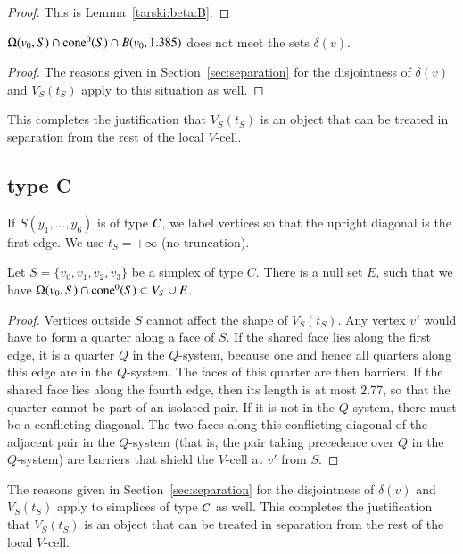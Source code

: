 \begin{proof} This is Lemma~\ref{tarski:beta:B}.
\end{proof}

\begin{lemma} $\Omega(v_0,S) \cap {\operatorname{cone}}^0(S) \cap B(v_0,1.385)$
does not meet the sets $\delta(v)$.
\end{lemma}

\begin{proof}
The reasons given in Section~\ref{sec:separation} for the
disjointness of $\delta(v)$ and $V_S(t_S)$ apply to this
situation as well.
\end{proof}


This completes the justification that
$V_S(t_S)$ is an object that can be treated in separation from the
rest of the local $V$-cell.

\subsection{type C}%

If $S(y_1,\ldots,y_6)$ is of type $C$, we label vertices so that
the upright diagonal is the first edge.  We use $t_S =+\infty$ (no
truncation).   

\begin{lemma} Let $S=\{v_0,v_1,v_2,v_3\}$ be a simplex of type $C$.
There is a null set $E$, such that
we have  $ \Omega(v_0,S) \cap {\operatorname{cone}}^0(S) \subset V_S \cup E$.
\end{lemma}

\begin{proof}  %
Vertices outside $S$ cannot affect the shape of $V_S(t_S)$.  Any
vertex $v'$ would have to form a quarter along a face of $S$.  If
the shared face lies along the first edge, it is a quarter $Q$ in
the $Q$-system, because one and hence all quarters along this edge
are in the $Q$-system.  The faces of this quarter are then
barriers. If the shared face lies along the fourth edge, then its
length is at most $2.77$, so that the quarter cannot be part of an
isolated pair. If it is not in the $Q$-system, there must be a
conflicting diagonal. The two faces along this conflicting
diagonal of the adjacent pair in the $Q$-system (that is, the pair
taking precedence over $Q$ in the $Q$-system) are barriers that
shield the $V$-cell at $v'$ from $S$.
\end{proof}

The reasons given in Section~\ref{sec:separation} for the
disjointness of $\delta(v)$ and $V_S(t_S)$ apply to simplices of
type $C$ as well. This completes the justification that
$V_S(t_S)$ is an object that can be treated in separation from the
rest of the local $V$-cell.

